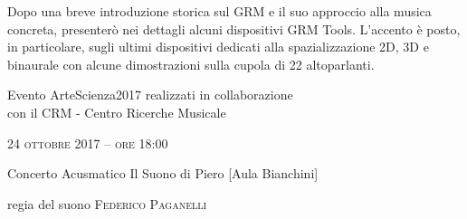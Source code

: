 \documentclass[9pt,
			   twoside
			   ]{extreport}
\begin{document}
\bigskip

Dopo una breve introduzione storica sul GRM e il suo approccio alla musica concreta, presenterò nei dettagli alcuni dispositivi GRM Tools. L’accento è posto, in particolare, sugli ultimi dispositivi dedicati alla spazializzazione 2D, 3D e binaurale con alcune dimostrazioni sulla cupola di 22 altoparlanti.

\bigskip

\small{Evento ArteScienza2017 realizzati in collaborazione\\con il CRM - Centro Ricerche Musicale}

\vfill

\large{
	\scshape{
	24 ottobre 2017 -- ore 18:00
	}}

\medskip

\small{Concerto Acusmatico
	\newline Il Suono di Piero [Aula Bianchini]}

\medskip


{\fontsize{20}{20} }

\normalsize

\medskip

regia del suono \textsc{Federico Paganelli}

\bigskip

\medskip

\medskip

\medskip

\medskip

\medskip
\end{document}
